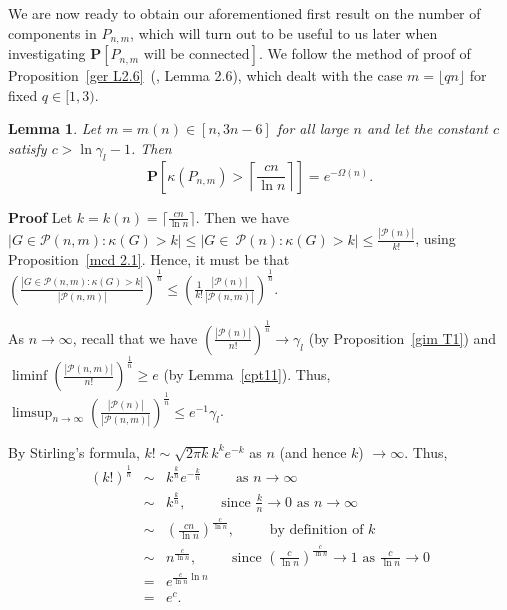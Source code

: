 \documentclass{article}
\newtheorem{Lemma}[Theorem]{Lemma}
\newtheorem{Proof of Theorem}{Proof of Theorem}
\begin{document}
We are now ready to obtain our aforementioned first result on the number of components in $P_{n,m}$,
which will turn out to be useful to us later when investigating
$\mathbf{P}[P_{n,m} \textrm{ will be connected}]$.
We follow the method of proof of Proposition~\ref{ger L2.6}~(\cite{ger}, Lemma 2.6),
which dealt with the case $m = \lfloor qn \rfloor$ for fixed $q \in [1,3)$.















\begin{Lemma} \label{cpt12}
Let $m=m(n) \in [n,3n-6]$ for all large $n$ and let the constant $c$ satisfy $c> \ln \gamma_{l} - 1$.
Then
\begin{displaymath}
\mathbf{P} \left[ \kappa (P_{n,m}) > \left \lceil \frac{cn}{\ln n} \right \rceil \right] = e^{- \Omega(n)}.
\end{displaymath}
\end{Lemma}
\textbf{Proof}
Let $k=k(n)=\lceil \frac{cn}{\ln n} \rceil$.
Then we have 
$|G \in \mathcal{P}(n,m): \kappa(G)>k| \leq |G \in~\mathcal{P}(n): \kappa(G)>k| \leq \frac{|\mathcal{P}(n)|}{k!}$, 
using Proposition~\ref{mcd 2.1}.
Hence,
it must be that
$
\left(\frac{|G \in \mathcal{P}(n,m):\kappa(G)>k|}{|\mathcal{P}(n,m)|} \right)^{\frac{1}{n}} \leq
\left( \frac{1}{k!} \frac{|\mathcal{P}(n)|}{|\mathcal{P}(n,m)|} \right)^{\frac{1}{n}}. 
$

As $n \to \infty$,
recall that
we have $\left( \frac{|\mathcal{P}(n)|}{n!} \right)^{\frac{1}{n}} \to \gamma_{l}$ (by Proposition~\ref{gim T1})
and $\liminf \left( \frac{|\mathcal{P}(n,m)|}{n!} \right)^{\frac{1}{n}} \!\geq\! e$ (by Lemma~\ref{cpt11}).
Thus, 
$\limsup_{n \to \infty} \left( \frac{|\mathcal{P}(n)|}{|\mathcal{P}(n,m)|} \right)^{\frac{1}{n}} 
\!\leq\! e^{-1} \gamma_{l}$. 

By Stirling's formula,
$k! \sim \sqrt{2 \pi k} k^{k} e^{-k}$ as $n$ (and hence $k$) $\to \infty$.
Thus,
\begin{eqnarray*}
(k!)^{\frac{1}{n}} & \sim & k^{\frac{k}{n}} e^{-\frac{k}{n}} \phantom{www} \textrm{ as } n \to \infty \\
& \sim & k^{\frac{k}{n}}, \phantom{www} \textrm{ since } \frac{k}{n} \to 0 \textrm{ as } n \to \infty \\
& \sim & \left( \frac{cn}{\ln n} \right) ^{\frac{c}{\ln n}}, \phantom{www} \textrm{ by definition of } k \\
& \sim & n^{\frac{c}{\ln n}}, \phantom{www} \textrm{ since } 
\left( \frac{c}{\ln n} \right) ^{\frac{c}{\ln n}} \to 1 \textrm { as } \frac{c}{\ln n} \to 0 \\
& = & e^{\frac{c}{\ln n } \ln n} \\
& = & e^{c}.
\end{eqnarray*}
\end{document}
